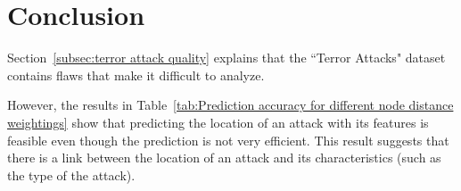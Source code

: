 \section{Conclusion}
\label{sec:Conclusion}
Section~\ref{subsec:terror attack quality} explains that the ``Terror Attacks" dataset contains flaws that make it difficult to analyze.

However, the results in Table~\ref{tab:Prediction accuracy for different node distance weightings} show that predicting the location of an attack with its features is feasible even though the prediction is not very efficient. This result suggests that there is a link between the location of an attack and its characteristics (such as the type of the attack).